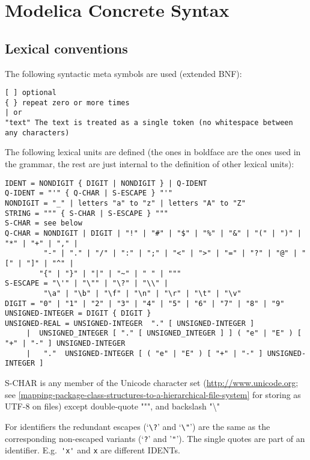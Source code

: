 \chapter{Modelica Concrete Syntax}
\section{Lexical conventions}

The following syntactic meta symbols are used (extended BNF):
\begin{lstlisting}[language=grammar]
[ ] optional
{ } repeat zero or more times
| or
"text" The text is treated as a single token (no whitespace between any characters)
\end{lstlisting}

The following lexical units are defined (the ones in boldface are the
ones used in the grammar, the rest are just internal to the definition
of other lexical units):
\begin{lstlisting}[language=grammar,mathescape=false]
IDENT = NONDIGIT { DIGIT | NONDIGIT } | Q-IDENT
Q-IDENT = "'" { Q-CHAR | S-ESCAPE } "'"
NONDIGIT = "_" | letters "a" to "z" | letters "A" to "Z"
STRING = """ { S-CHAR | S-ESCAPE } """
S-CHAR = see below
Q-CHAR = NONDIGIT | DIGIT | "!" | "#" | "$" | "%" | "&" | "(" | ")" | "*" | "+" | "," |
         "-" | "." | "/" | ":" | ";" | "<" | ">" | "=" | "?" | "@" | "[" | "]" | "^" |
        "{" | "}" | "|" | "~" | " " | """
S-ESCAPE = "\'" | "\"" | "\?" | "\\" |
         "\a" | "\b" | "\f" | "\n" | "\r" | "\t" | "\v"
DIGIT = "0" | "1" | "2" | "3" | "4" | "5" | "6" | "7" | "8" | "9"
UNSIGNED-INTEGER = DIGIT { DIGIT }
UNSIGNED-REAL = UNSIGNED-INTEGER  "." [ UNSIGNED-INTEGER ]
     |  UNSIGNED_INTEGER [ "." [ UNSIGNED_INTEGER ] ] ( "e" | "E" ) [ "+" | "-" ] UNSIGNED-INTEGER
     |   "."  UNSIGNED-INTEGER [ ( "e" | "E" ) [ "+" | "-" ] UNSIGNED-INTEGER ]
\end{lstlisting}
\textrm{S-CHAR} is any member of the Unicode character set
(\url{http://www.unicode.org}; see \autoref{mapping-package-class-structures-to-a-hierarchical-file-system} for storing as UTF-8 on files) except double-quote """, and backslash "\textbackslash{}"

For identifiers the redundant escapes (`\lstinline!\?!' and `\lstinline!\"!') are the same as the corresponding non-escaped
variants (`\lstinline!?!' and '\lstinline!"!').  The single quotes are part of an identifier. E.g.\ \lstinline!'x'! and
\lstinline!x! are different IDENTs.

